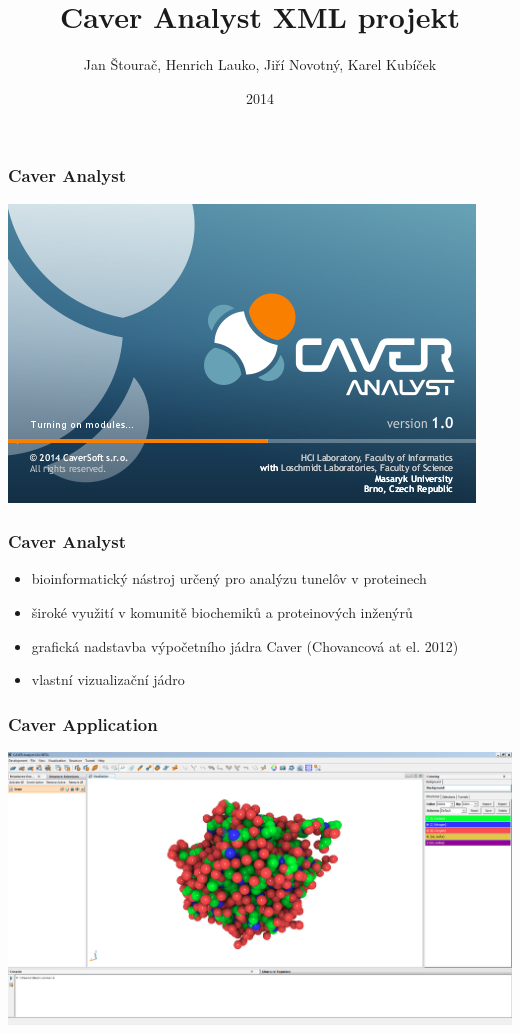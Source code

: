 \documentclass[slovak]{beamer}
\title{Caver Analyst XML projekt}
\date{2014}
\author{
	Jan Štourač, Henrich Lauko, Jiří Novotný, Karel Kubíček
}
\begin{document}
\begin{frame}
	\titlepage
\end{frame}

\begin{frame}
\frametitle{Caver Analyst}
	\includegraphics[width=\linewidth]{caver_start.jpg}
\end{frame}

\begin{frame}
\frametitle{Caver Analyst}
	\begin{itemize}
		\item bioinformatický nástroj určený pro analýzu tunelôv v proteinech
		\item široké využití v komunitě biochemiků a proteinových inženýrů 
		\item grafická nadstavba výpočetního jádra Caver (Chovancová at el. 2012)
		\item vlastní vizualizační jádro
	\end{itemize}
\end{frame}

\begin{frame}
\frametitle{Caver Application}
	\begin{center}
		\includegraphics[width=\linewidth]{caver.png}
	\end{center}
\end{frame}
\end{document}
